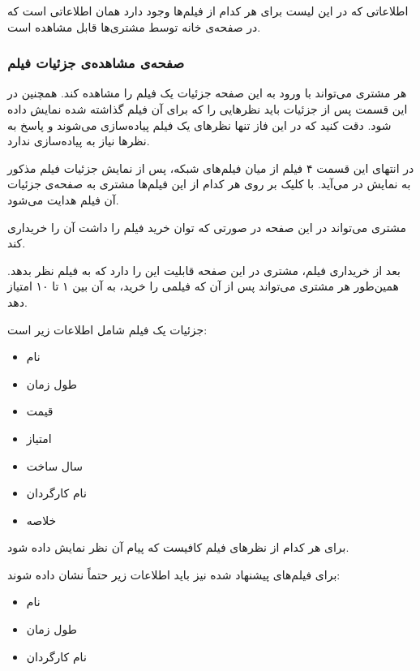 \documentclass{utap}
\begin{document}
        اطلاعاتی که در این لیست برای هر کدام از فیلم‌ها وجود دارد همان اطلاعاتی‌ است که در صفحه‌ی خانه توسط مشتری‌ها قابل مشاهده است.

    
        \subsubsection{صفحه‌ی مشاهده‌ی جزئیات فیلم }
        
        هر مشتری می‌تواند با ورود به این صفحه جزئیات یک فیلم را مشاهده کند. همچنین در این قسمت پس از جزئیات باید نظرهایی را که برای آن فیلم گذاشته شده نمایش داده شود. دقت کنید که در این فاز تنها نظر‌های یک فیلم پیاده‌سازی می‌شوند و پاسخ به نظر‌ها نیاز به پیاده‌سازی ندارد.
        
        در  انتهای این قسمت ۴ فیلم از میان فیلم‌های شبکه، پس از نمایش جزئیات فیلم مذکور به نمایش در می‌آید. 
    با کلیک بر روی هر کدام از این فیلم‌ها مشتری به صفحه‌ی جزئیات آن فیلم هدایت می‌شود. 
        
        مشتری می‌تواند در این صفحه در صورتی که توان خرید فیلم را داشت آن‌ را خریداری کند. 
        
        بعد از خریداری فیلم، مشتری در این صفحه قابلیت این را دارد که به فیلم نظر بدهد. همین‌طور هر مشتری می‌تواند پس از آن‌ که فیلمی را خرید، به آن بین ۱ تا ۱۰ امتیاز دهد. 
        
        جزئیات یک فیلم شامل اطلاعات زیر است: 
        
        \begin{multicols}{3}
        \begin{itemize}
            \item نام 
            \item طول زمان  
            \item قیمت 
            \item امتیاز 
            \item سال ساخت
            \item نام کارگردان
            \item خلاصه‌
        \end{itemize}
        \end{multicols}
    
        برای هر کدام از نظر‌های فیلم کافیست که پیام آن نظر‌ نمایش داده شود.
        
        برای فیلم‌های پیشنهاد شده نیز باید اطلاعات زیر حتماً نشان داده شوند:
        
        \begin{multicols}{3}
            \begin{itemize}
                \item نام
                \item طول زمان
                \item نام کارگردان
            \end{itemize}
        \end{multicols}
    
\end{document}
